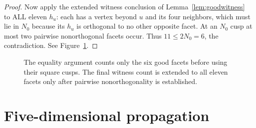 \documentclass[11pt]{article}
\theoremstyle{remark}
\begin{document}
\begin{proof}
Now apply the extended witness conclusion of
Lemma~\ref{lem:goodwitness} to ALL eleven $h_u$: each has a vertex
beyond $u$ and its four neighbors, which must lie in $N_0$ because
its $h_u$ is orthogonal to no other opposite facet. At an $N_0$ cusp
at most two pairwise nonorthogonal facets occur. Thus $11\le2N_0=6$,
the contradiction. See Figure~\ref{fig:equality}.
\end{proof}

\begin{figure}[tb]
\centering
{}
\caption{The equality argument counts only the six good facets before
using their square cusps. The final witness count is extended to all
eleven facets only after pairwise nonorthogonality is established.}
\label{fig:equality}
\end{figure}

\section{Five-dimensional propagation}\label{sec:fiveprop}
\end{document}
